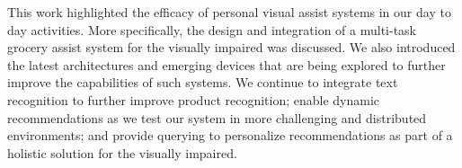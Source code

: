 This work highlighted the efficacy of personal visual assist systems in our day to day activities. 
More specifically, the design and integration of a multi-task grocery assist system for the visually impaired was 
discussed. We also introduced the latest architectures and emerging devices that are being explored to further improve the capabilities of such systems. 
We continue to integrate text recognition to further improve product recognition; enable dynamic recommendations as we test our system in more challenging 
and distributed environments; and provide querying to personalize recommendations as part of a holistic solution for the visually impaired. 
